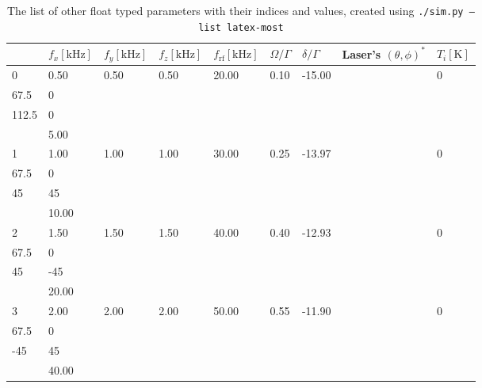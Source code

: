 \begin{longtable}{lllllllrl}
\caption{The list of other float typed parameters with their indices and values, created using \texttt{./sim.py --list latex-most}}\label{tbl:sim-list-most} \\
\hline
    & $f_x \mathrm{[kHz]}$   & $f_y \mathrm{[kHz]}$   & $f_z \mathrm{[kHz]}$   & $f_\mathrm{rf} \mathrm{[kHz]}$   & $\Omega/\Gamma$   & $\delta/\Gamma$   &                                                           Laser's $(\theta,\phi)^*$ & $T_i \mathrm{[K]}$   \\ \hline
\hline \hline\endhead
 0  & 0.50                   & 0.50                   & 0.50                   & 20.00                            & 0.10              & -15.00            &       \begin{tabular}{lr}   0     & 0 \\  67.5  & 0 \\  112.5 & 0 \\  \end{tabular} & 5.00                 \\ \hline
 1  & 1.00                   & 1.00                   & 1.00                   & 30.00                            & 0.25              & -13.97            &       \begin{tabular}{lr}   0    &  0 \\  67.5 &  0 \\  45   & 45 \\  \end{tabular} & 10.00                \\ \hline
 2  & 1.50                   & 1.50                   & 1.50                   & 40.00                            & 0.40              & -12.93            &    \begin{tabular}{lr}   0    &   0 \\  67.5 &   0 \\  45   & -45 \\  \end{tabular} & 20.00                \\ \hline
 3  & 2.00                   & 2.00                   & 2.00                   & 50.00                            & 0.55              & -11.90            &       \begin{tabular}{lr}   0    &  0 \\  67.5 &  0 \\  -45  & 45 \\  \end{tabular} & 40.00                \\ \hline

\end{longtable}
